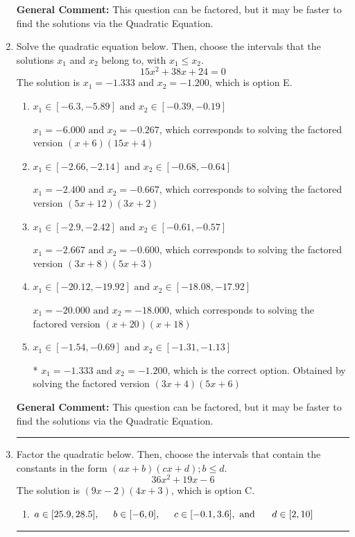 \documentclass{extbook}[14pt]
\newcommand{\litem}[1]{\item #1

\rule{\textwidth}{0.4pt}}
\begin{document}
\begin{enumerate}
{\textbf{General Comment:} This question can be factored, but it may be faster to find the solutions via the Quadratic Equation.
}
\litem{
Solve the quadratic equation below. Then, choose the intervals that the solutions $x_1$ and $x_2$ belong to, with $x_1 \leq x_2$.
\[ 15x^{2} +38 x + 24 = 0 \]The solution is \( x_1 = -1.333 \text{ and } x_2 = -1.200 \), which is option E.\begin{enumerate}[label=\Alph*.]
\item \( x_1 \in [-6.3, -5.89] \text{ and } x_2 \in [-0.39, -0.19] \)

$x_1 = -6.000 \text{ and } x_2 = -0.267$, which corresponds to solving the factored version $(x + 6)(15x + 4)$
\item \( x_1 \in [-2.66, -2.14] \text{ and } x_2 \in [-0.68, -0.64] \)

$x_1 = -2.400 \text{ and } x_2 = -0.667$, which corresponds to solving the factored version $(5x + 12)(3x + 2)$
\item \( x_1 \in [-2.9, -2.42] \text{ and } x_2 \in [-0.61, -0.57] \)

$x_1 = -2.667 \text{ and } x_2 = -0.600$, which corresponds to solving the factored version $(3x + 8)(5x + 3)$
\item \( x_1 \in [-20.12, -19.92] \text{ and } x_2 \in [-18.08, -17.92] \)

$x_1 = -20.000 \text{ and } x_2 = -18.000$, which corresponds to solving the factored version $(x + 20)(x + 18)$
\item \( x_1 \in [-1.54, -0.69] \text{ and } x_2 \in [-1.31, -1.13] \)

* $x_1 = -1.333 \text{ and } x_2 = -1.200$, which is the correct option. Obtained by solving the factored version $(3x + 4)(5x + 6)$
\end{enumerate}

\textbf{General Comment:} This question can be factored, but it may be faster to find the solutions via the Quadratic Equation.
}
\litem{
Factor the quadratic below. Then, choose the intervals that contain the constants in the form $(ax+b)(cx+d); b \leq d.$
\[ 36x^{2} +19 x -6 \]The solution is \( (9x -2)(4x + 3) \), which is option C.\begin{enumerate}[label=\Alph*.]
\item \( a \in [25.9, 28.5], \hspace*{5mm} b \in [-6, 0], \hspace*{5mm} c \in [-0.1, 3.6], \text{ and } \hspace*{5mm} d \in [2, 10] \)


\end{enumerate}}
\end{enumerate}
\end{document}
